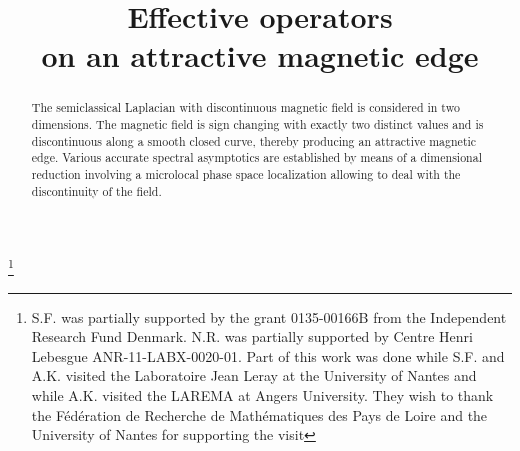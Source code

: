 \documentclass[JEP,XML,SOM,Unicode,NoFloatCountersInSection,published]{cedram}
\theoremstyle{plain}
\theoremstyle{definition}
\begin{document}
\frontmatter

\title[Attractive magnetic edge]{Effective operators\\ on an attractive magnetic edge}

\author[\initial{S.} \lastname{Fournais}]{ }
\address{Department of Mathematical Sciences, University of Copenhagen\\
Universitetsparken 5, DK-2100 Copenhagen \O, Denmark}
\urladdr{}


\author[\initial{B.} \lastname{Helffer}]{ }
\address{Nantes Universit\'e, Laboratoire Jean Leray\\
Nantes, France}


\author[\initial{A.} \lastname{Kachmar}]{ }
\address{Lebanese University, Department of Mathematics\\
Nabatiye, Lebanon}
\urladdr{}


\author[\initial{N.} \lastname{Raymond}]{\nobreakauthor {}}
\address{Univ Angers, CNRS, LAREMA, Institut Universitaire de France, SFR MATHSTIC\\
F-49000 Angers, France}

\thanks{S.F. was partially supported by the grant 0135-00166B from the Independent Research Fund Denmark.
N.R. was partially supported by Centre Henri Lebesgue ANR-11-LABX-0020-01.
Part of this work was done while S.F. and A.K. visited the Laboratoire Jean Leray at the University of Nantes
and while A.K. visited the LAREMA at Angers University. They wish to thank the F\'{e}d\'{e}ration de Recherche de Math\'{e}matiques des Pays de Loire and the University of Nantes for supporting the visit}

\begin{abstract}
The semiclassical Laplacian with discontinuous magnetic field is considered in two dimensions. The magnetic field is sign changing with exactly two distinct values and is discontinuous along a smooth closed curve, thereby producing an attractive magnetic edge. Various accurate spectral asymptotics are established by means of a dimensional reduction involving a microlocal phase space localization allowing to deal with the discontinuity of the field.
\end{abstract}
\end{document}
